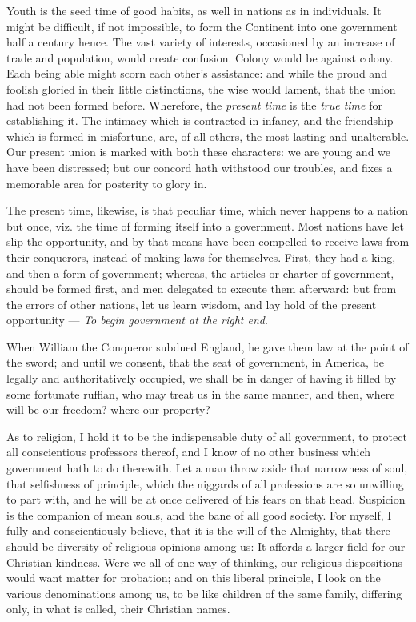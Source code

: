 \documentclass[12pt, twocolumn]{book}
\begin{document}
    Youth is the seed time of good habits, as well in nations as in individuals. It might be difficult, if not impossible, to form the Continent into one government half a century hence. The vast variety of interests, occasioned by an increase of trade and population, would create confusion. Colony would be against colony. Each being able might scorn each other’s assistance: and while the proud and foolish gloried in their little distinctions, the wise would lament, that the union had not been formed before. Wherefore, the \textit{present time} is the \textit{true time} for establishing it. The intimacy which is contracted in infancy, and the friendship which is formed in misfortune, are, of all others, the most lasting and unalterable. Our present union is marked with both these characters: we are young and we have been distressed; but our concord hath withstood our troubles, and fixes a memorable area for posterity to glory in.

    The present time, likewise, is that peculiar time, which never happens to a nation but once, viz. the time of forming itself into a government. Most nations have let slip the opportunity, and by that means have been compelled to receive laws from their conquerors, instead of making laws for themselves. First, they had a king, and then a form of government; whereas, the articles or charter of government, should be formed first, and men delegated to execute them afterward: but from the errors of other nations, let us learn wisdom, and lay hold of the present opportunity — \textit{To begin government at the right end}.

    When William the Conqueror subdued England, he gave them law at the point of the sword; and until we consent, that the seat of government, in America, be legally and authoritatively occupied, we shall be in danger of having it filled by some fortunate ruffian, who may treat us in the same manner, and then, where will be our freedom? where our property?

    As to religion, I hold it to be the indispensable duty of all government, to protect all conscientious professors thereof, and I know of no other business which government hath to do therewith. Let a man throw aside that narrowness of soul, that selfishness of principle, which the niggards of all professions are so unwilling to part with, and he will be at once delivered of his fears on that head. Suspicion is the companion of mean souls, and the bane of all good society. For myself, I fully and conscientiously believe, that it is the will of the Almighty, that there should be diversity of religious opinions among us: It affords a larger field for our Christian kindness. Were we all of one way of thinking, our religious dispositions would want matter for probation; and on this liberal principle, I look on the various denominations among us, to be like children of the same family, differing only, in what is called, their Christian names.
\end{document}
